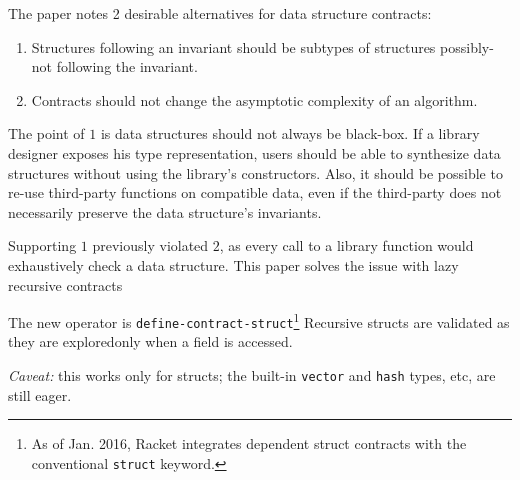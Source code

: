 \documentclass{article}
\begin{document}

The paper notes 2 desirable alternatives for data structure contracts:
\begin{enumerate}
\item Structures following an invariant should be subtypes of structures possibly-not following the invariant.
\item Contracts should not change the asymptotic complexity of an algorithm.
\end{enumerate}

The point of $1$ is data structures should not always be black-box.
If a library designer exposes his type representation, users should be able to synthesize data structures without using the library's constructors.
Also, it should be possible to re-use third-party functions on compatible data, even if the third-party does not necessarily preserve the data structure's invariants.

Supporting $1$ previously violated $2$, as every call to a library function would exhaustively check a data structure.
This paper solves the issue with lazy recursive contracts~\cite{fgr-lazy} 

The new operator is {\tt define-contract-struct}\footnote{As of Jan. 2016, Racket integrates dependent struct contracts with the conventional {\tt struct} keyword.}
Recursive structs are validated as they are explored\textemdash only when a field is accessed.

\emph{Caveat:} this works only for structs; the built-in {\tt vector} and {\tt hash} types, etc, are still eager.

\footnotesize


\end{document}
